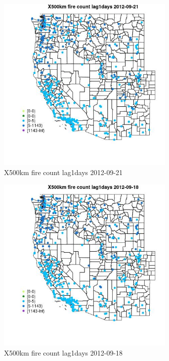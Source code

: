 \begin{figure} 
\centering  
\includegraphics[width=0.77\textwidth]{Code_Outputs/Report_ML_input_PM25_Step4_part_e_de_duplicated_aves_compiled_2019-05-14wNAs_MapObsX500km_fire_count_lag1days2012-09-21.jpg} 
\caption{\label{fig:Report_ML_input_PM25_Step4_part_e_de_duplicated_aves_compiled_2019-05-14wNAsMapObsX500km_fire_count_lag1days2012-09-21}X500km fire count lag1days 2012-09-21} 
\end{figure} 
 

\begin{figure} 
\centering  
\includegraphics[width=0.77\textwidth]{Code_Outputs/Report_ML_input_PM25_Step4_part_e_de_duplicated_aves_compiled_2019-05-14wNAs_MapObsX500km_fire_count_lag1days2012-09-18.jpg} 
\caption{\label{fig:Report_ML_input_PM25_Step4_part_e_de_duplicated_aves_compiled_2019-05-14wNAsMapObsX500km_fire_count_lag1days2012-09-18}X500km fire count lag1days 2012-09-18} 
\end{figure} 
 

